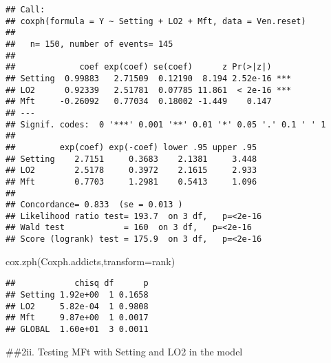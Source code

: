 \documentclass[
]{article}
\newenvironment{Shaded}{\begin{snugshade}}{\end{snugshade}}
\newcommand{\AttributeTok}[1]{\textcolor[rgb]{0.77,0.63,0.00}{#1}}
\newcommand{\FunctionTok}[1]{\textcolor[rgb]{0.00,0.00,0.00}{#1}}
\newcommand{\NormalTok}[1]{#1}
\begin{document}
\begin{verbatim}
## Call:
## coxph(formula = Y ~ Setting + LO2 + Mft, data = Ven.reset)
## 
##   n= 150, number of events= 145 
## 
##             coef exp(coef) se(coef)      z Pr(>|z|)    
## Setting  0.99883   2.71509  0.12190  8.194 2.52e-16 ***
## LO2      0.92339   2.51781  0.07785 11.861  < 2e-16 ***
## Mft     -0.26092   0.77034  0.18002 -1.449    0.147    
## ---
## Signif. codes:  0 '***' 0.001 '**' 0.01 '*' 0.05 '.' 0.1 ' ' 1
## 
##         exp(coef) exp(-coef) lower .95 upper .95
## Setting    2.7151     0.3683    2.1381     3.448
## LO2        2.5178     0.3972    2.1615     2.933
## Mft        0.7703     1.2981    0.5413     1.096
## 
## Concordance= 0.833  (se = 0.013 )
## Likelihood ratio test= 193.7  on 3 df,   p=<2e-16
## Wald test            = 160  on 3 df,   p=<2e-16
## Score (logrank) test = 175.9  on 3 df,   p=<2e-16
\end{verbatim}

\begin{Shaded}
\begin{Highlighting}[]
\FunctionTok{cox.zph}\NormalTok{(Coxph.addicts,}\AttributeTok{transform=}\NormalTok{rank)}
\end{Highlighting}
\end{Shaded}

\begin{verbatim}
##            chisq df      p
## Setting 1.92e+00  1 0.1658
## LO2     5.82e-04  1 0.9808
## Mft     9.87e+00  1 0.0017
## GLOBAL  1.60e+01  3 0.0011
\end{verbatim}

\#\#2ii. Testing MFt with Setting and LO2 in the model
\end{document}
